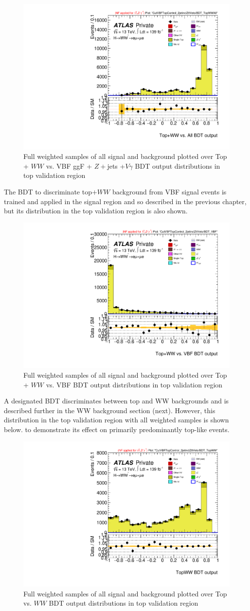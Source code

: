 \begin{figure}[!htbp]
\centering
\includegraphics[width=.5\linewidth]{Pictures/run2-emme-CutVBFTopControl_2jetinclZttVeto-BDT_TopWWAll-lin.pdf}
\caption{Full weighted samples of all signal and background plotted over Top + $WW$ vs. VBF ggF + $Z+$jets +$V\gamma$ BDT output distributions in top validation region}
\label{fig:VBFTopWWBDTVR}
\end{figure}

The BDT to discriminate top$+WW$ background from VBF signal events is trained and applied in the signal region and so described in the previous chapter, but its distribution in the top validation region is also shown. 

\begin{figure}[!htbp]
\centering
\includegraphics[width=.5\linewidth]{Pictures/run2-emme-CutVBFTopControl_2jetinclZttVeto-BDT_VBF-lin.pdf}
\caption{Full weighted samples of all signal and background plotted over Top + $WW$ vs. VBF BDT output distributions in top validation region}
\label{fig:VBFTopWWBDTVR}
\end{figure}

A designated BDT discriminates between top and WW backgrounds and is described further in the WW background section (next). However, this distribution in the top validation region with all weighted samples is shown below. to demonstrate its effect on primarily predominantly top-like events.

\begin{figure}[!htbp]
\centering
\includegraphics[width=.5\linewidth]{Pictures/run2-emme-CutVBFTopControl_2jetinclZttVeto-BDT_TopWW-lin.pdf}
\caption{Full weighted samples of all signal and background plotted over Top vs. $WW$ BDT output distributions in top validation region}
\label{fig:TopWWBDTVR}
\end{figure}

